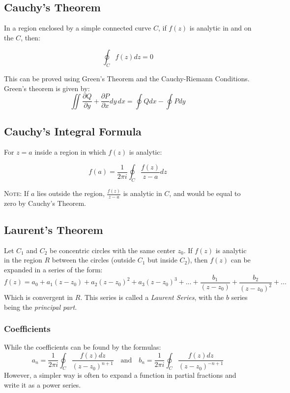 \documentclass[12pt]{article}
\begin{document}
\subsection{Cauchy's Theorem}
In a region enclosed by a simple connected curve $C$, if $f(z)$ is analytic in and on the $C$, then:

\[ \oint_C f(z) dz = 0\]

This can be proved using Green's Theorem and the Cauchy-Riemann Conditions. Green's theorem is given by:
\[\iint \frac{\partial Q}{\partial y} + \frac{\partial P}{\partial x} dy\,dx = \oint Qdx - \oint P dy\]

\subsection{Cauchy's Integral Formula}

For $z=a$ inside a region in which $f(z)$ is analytic:

\[ f(a) = \frac{1}{2\pi i} \oint_C \frac{f(z)}{z-a} dz\]

\textsc{Note}: If $a$ lies outside the region, $\frac{f(z)}{z-a}$ is analytic in $C$, and would be equal to zero by Cauchy's Theorem.

\subsection{Laurent's Theorem}

Let $C_1$ and $C_2$ be concentric circles with the same center $z_0$. If $f(z)$ is analytic in the region $R$ between the circles (outside $C_1$ but inside $C_2$), then $f(z)$ can be expanded in a series of the form:
\[ f(z) = a_0 + a_1(z-z_0) + a_2(z-z_0)^2+a_3(z-z_0)^3 +...+\frac{b_1}{(z-z_0)}+\frac{b_2}{(z-z_0)^2}+...\] 
Which is convergent in $R$. This series is called a \textit{Laurent Series}, with the $b$ series being the \textit{principal part}.

\subsubsection{Coefficients}
While the coefficients can be found by the formulas:
\[
a_n = \frac{1}{2\pi i} \oint_C \frac{f(z)dz}{(z-z_0)^{n+1}} \quad\text{and}\quad b_n = \frac{1}{2\pi i} \oint_C \frac{f(z)dz}{(z-z_0)^{-n+1}}
\]
However, a simpler way is often to expand a function in partial fractions and write it as a power series. 
\end{document}
